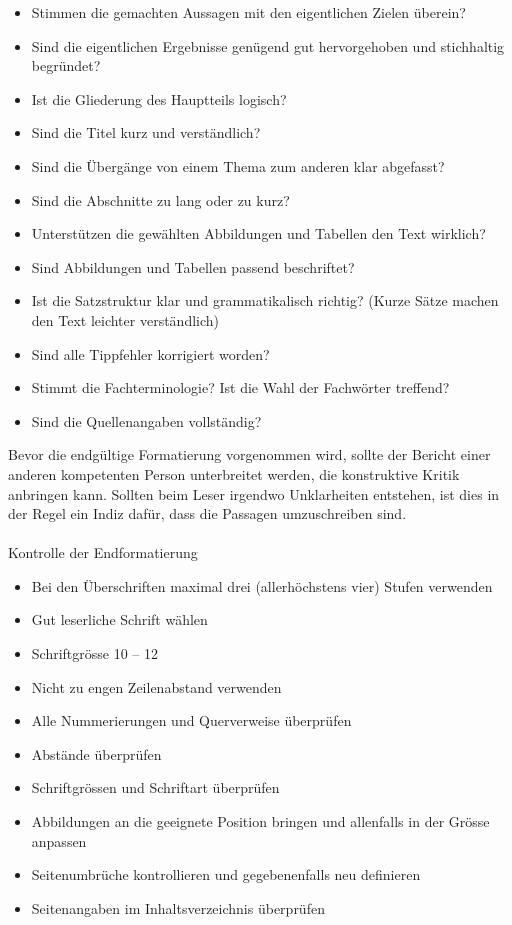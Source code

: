 \documentclass[
  letterpaper,
  DIV=11]{scrartcl}
\makeatletter
\let\oldparagraph\paragraph
\renewcommand{\paragraph}{
    \@ifstar
      \xxxParagraphStar
      \xxxParagraphNoStar
  }
\newcommand{\xxxParagraphStar}[1]{\oldparagraph*{#1}\mbox{}}
\newcommand{\xxxParagraphNoStar}[1]{\oldparagraph{#1}\mbox{}}
\makeatother
\begin{document}
\begin{itemize}
\item
  Stimmen die gemachten Aussagen mit den eigentlichen Zielen überein?
\item
  Sind die eigentlichen Ergebnisse genügend gut hervorgehoben und
  stichhaltig begründet?
\item
  Ist die Gliederung des Hauptteils logisch?
\item
  Sind die Titel kurz und verständlich?
\item
  Sind die Übergänge von einem Thema zum anderen klar abgefasst?
\item
  Sind die Abschnitte zu lang oder zu kurz?
\item
  Unterstützen die gewählten Abbildungen und Tabellen den Text wirklich?
\item
  Sind Abbildungen und Tabellen passend beschriftet?
\item
  Ist die Satzstruktur klar und grammatikalisch richtig? (Kurze Sätze
  machen den Text leichter verständlich)
\item
  Sind alle Tippfehler korrigiert worden?
\item
  Stimmt die Fachterminologie? Ist die Wahl der Fachwörter treffend?
\item
  Sind die Quellenangaben vollständig?
\end{itemize}

Bevor die endgültige Formatierung vorgenommen wird, sollte der Bericht
einer anderen kompetenten Person unterbreitet werden, die konstruktive
Kritik anbringen kann. Sollten beim Leser irgendwo Unklarheiten
entstehen, ist dies in der Regel ein Indiz dafür, dass die Passagen
umzuschreiben sind.

\paragraph{Kontrolle der
Endformatierung}\label{kontrolle-der-endformatierung}

\begin{itemize}
\item
  Bei den Überschriften maximal drei (allerhöchstens vier) Stufen
  verwenden
\item
  Gut leserliche Schrift wählen
\item
  Schriftgrösse 10 -- 12
\item
  Nicht zu engen Zeilenabstand verwenden
\item
  Alle Nummerierungen und Querverweise überprüfen
\item
  Abstände überprüfen
\item
  Schriftgrössen und Schriftart überprüfen
\item
  Abbildungen an die geeignete Position bringen und allenfalls in der
  Grösse anpassen
\item
  Seitenumbrüche kontrollieren und gegebenenfalls neu definieren
\item
  Seitenangaben im Inhaltsverzeichnis überprüfen
\end{itemize}
\end{document}

